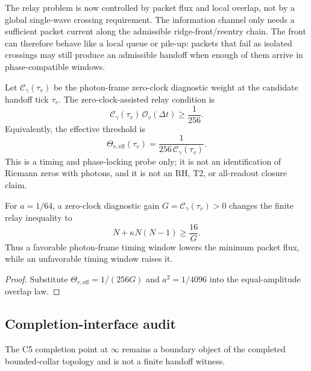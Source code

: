 \begin{remark}
\label{rem:v470-r13-what-flowrate-change-brings}
The relay problem is now controlled by packet flux and local overlap, not by a
global single-wave crossing requirement.  The information channel only needs a
sufficient packet current along the admissible ridge-front/reentry chain.  The
front can therefore behave like a local queue or pile-up: packets that fail as
isolated crossings may still produce an admissible handoff when enough of them
arrive in phase-compatible windows.
\end{remark}

\begin{definition}
\label{def:v470-r13-zero-clock-assisted-relay-current}
Let \(\mathcal C_\gamma(\tau_v)\) be the photon-frame zero-clock diagnostic
weight at the candidate handoff tick \(\tau_v\).  The zero-clock-assisted relay
condition is
\[
\mathcal C_\gamma(\tau_v)\,\mathcal O_v(\Delta t)
\geq
\frac{1}{256}.
\]
Equivalently, the effective threshold is
\[
\Theta_{v,\mathrm{eff}}(\tau_v)
=
\frac{1}{256\,\mathcal C_\gamma(\tau_v)}.
\]
This is a timing and phase-locking probe only; it is not an identification of
Riemann zeros with photons, and it is not an RH, T2, or all-readout closure
claim.
\end{definition}

\begin{proposition}
\label{prop:v470-r13-flowrate-clock-gain-consequence}
For \(a=1/64\), a zero-clock diagnostic gain \(G=\mathcal C_\gamma(\tau_v)>0\)
changes the finite relay inequality to
\[
N+\kappa N(N-1)
\geq
\frac{16}{G}.
\]
Thus a favorable photon-frame timing window lowers the minimum packet flux, while
an unfavorable timing window raises it.
\end{proposition}

\begin{proof}
Substitute \(\Theta_{v,\mathrm{eff}}=1/(256G)\) and \(a^2=1/4096\) into the
equal-amplitude overlap law.
\end{proof}

\subsection{Completion-interface audit}
\label{subsec:v470-r13-completion-interface-audit}

\begin{proposition}
\label{prop:v470-r13-c5-completion-interface-audit}
The C5 completion point at \(\infty\) remains a boundary object of the completed
bounded-collar topology and is not a finite handoff witness.
\end{proposition}


